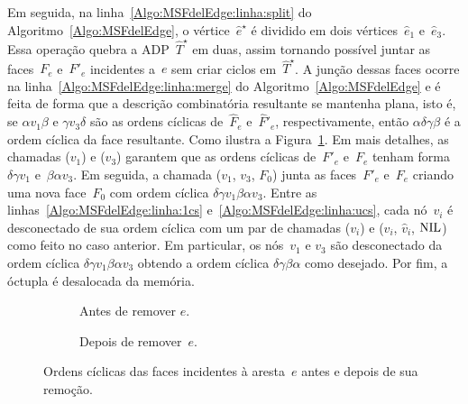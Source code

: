 Em seguida, na linha~\ref{Algo:MSFdelEdge:linha:split} do Algoritmo~\ref{Algo:MSFdelEdge}, o vértice~$\hat e^\star$ é dividido em dois vértices~$\hat e_1$ e~$\hat e_3$. 
Essa operação quebra a ADP~$\hat T^\star$ em duas, assim tornando possível juntar as faces~$F_e$ e~$F'_e$ incidentes a~$e$ sem criar ciclos em~$\hat T^\star$.
A junção dessas faces ocorre na linha~\ref{Algo:MSFdelEdge:linha:merge} do Algoritmo~\ref{Algo:MSFdelEdge} e é feita de forma que a descrição combinatória resultante se mantenha plana, isto é, se $\alpha v_1 \beta$ e $\gamma v_3 \delta$ são as ordens cíclicas de~$\hat F_e$ e~$\hat F'_e$, respectivamente, então $\alpha \delta\gamma\beta$ é a ordem cíclica da face resultante.
Como ilustra a Figura~\ref{fig:MSF-ordem-ciclica-nao-ponte}.
Em mais detalhes, as chamadas \LCOCycle($v_1$) e \LCOCycle($v_3$) garantem que as ordens cíclicas de~$F'_e$ e~$F_e$ tenham forma~$\delta\gamma v_1$ e~$\beta\alpha v_3$.
Em seguida, a chamada \LCOMerge($v_1$, $v_3$, $F_0$) junta as faces~$F'_e$ e~$F_e$ criando uma nova face~$F_0$ com ordem cíclica $\delta\gamma v_1\beta\alpha v_3$.
Entre as linhas~\ref{Algo:MSFdelEdge:linha:1cs} e~\ref{Algo:MSFdelEdge:linha:ucs}, cada nó~$v_i$ é desconectado de sua ordem cíclica com um par de chamadas \LCOCycle($v_i$) e \LCOSplit($v_i$, $\hat v_i$, $\text{NIL}$) como feito no caso anterior.
Em particular, os nós~$v_1$ e $v_3$ são desconectado da ordem cíclica $\delta\gamma v_1\beta\alpha v_3$ obtendo a ordem cíclica $\delta\gamma\beta\alpha$ como desejado.
Por fim, a óctupla é desalocada da memória.


\begin{figure}[h!]
\begin{subfigure}{.4\textwidth}

\caption{Antes de remover $e$.}
\label{fig:MSF-ordem-ciclica-nao-ponte}
\end{subfigure}
\hspace{2cm}
\begin{subfigure}{.4\textwidth}

\caption{Depois de remover~$e$.}
\label{fig:MSF-ordem-ciclica-nao-ponte-depois}
\end{subfigure}
\caption{Ordens cíclicas das faces incidentes à aresta~$e$ antes e depois de sua remoção.}
\end{figure}

